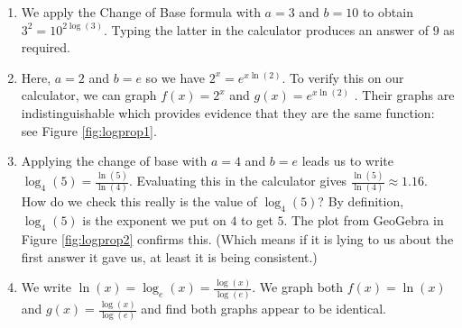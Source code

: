 {
\begin{enumerate}

\item  We apply the Change of Base formula with $a=3$ and $b=10$ to obtain $3^2 = 10^{2 \log(3)}$. Typing the latter in the calculator produces an answer of $9$ as required.

\item  Here, $a=2$ and $b = e$ so we have $2^{x} = e^{x \ln(2)}$.  To verify this on our calculator, we can graph $f(x) = 2^x$  and $g(x) = e^{x \ln(2)}$ .  Their graphs are indistinguishable which provides evidence that they are the same function: see Figure \ref{fig:logprop1}.


\item  Applying the change of base with $a=4$ and $b=e$ leads us to write $\log_{4}(5) = \frac{\ln(5)}{\ln(4)}$.  Evaluating this in the calculator gives $\frac{\ln(5)}{\ln(4)} \approx 1.16$.  How do we check this really is the value of $\log_{4}(5)$?  By definition, $\log_{4}(5)$ is the exponent we put on $4$ to get $5$.  The plot from GeoGebra in Figure \ref{fig:logprop2} confirms this. (Which means if it is lying to us about the first answer it gave us, at least it is being consistent.) 

\item  We write $\ln(x) = \log_{e}(x) = \frac{\log(x)}{\log(e)}$.  We graph both $f(x) = \ln(x)$ and $g(x) = \frac{\log(x)}{\log(e)}$ and find both graphs appear to be identical.


\end{enumerate}

}

\label{IntroExpLogsExercises}
